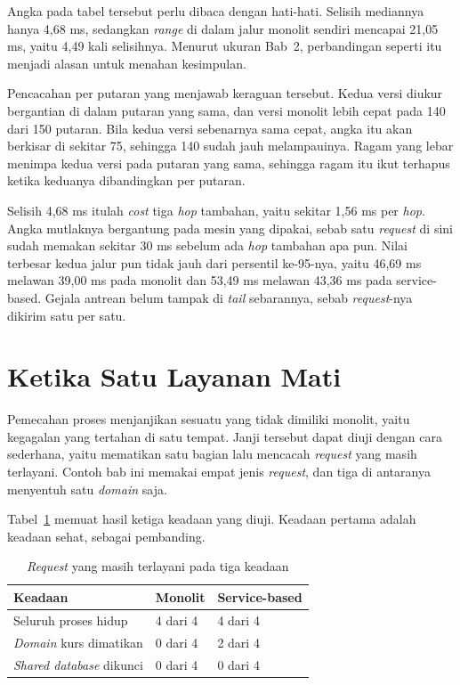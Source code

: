 Angka pada tabel tersebut perlu dibaca dengan hati-hati. Selisih mediannya
hanya 4,68 ms, sedangkan \textit{range} di dalam jalur
monolit sendiri mencapai
21,05 ms, yaitu 4,49 kali selisihnya. Menurut ukuran Bab~2, perbandingan seperti
itu menjadi alasan untuk menahan kesimpulan.

Pencacahan per putaran yang menjawab keraguan tersebut. Kedua versi diukur
bergantian di dalam putaran yang sama, dan versi monolit lebih cepat pada 140
dari 150 putaran. Bila kedua versi sebenarnya sama cepat, angka itu akan
berkisar di sekitar 75, sehingga 140 sudah jauh melampauinya. Ragam yang lebar
menimpa kedua versi pada putaran yang sama, sehingga ragam itu ikut terhapus
ketika keduanya dibandingkan per putaran.

Selisih 4,68 ms itulah \textit{cost} tiga \textit{hop} tambahan, yaitu sekitar 1,56 ms
per \textit{hop}. Angka mutlaknya bergantung pada mesin yang dipakai, sebab satu
\textit{request} di sini sudah memakan sekitar 30 ms sebelum ada \textit{hop}
tambahan apa pun. Nilai terbesar kedua jalur pun tidak jauh dari persentil
ke-95-nya, yaitu 46,69 ms melawan 39,00 ms pada monolit dan 53,49 ms melawan
43,36 ms pada service-based. Gejala antrean belum tampak di \textit{tail} sebarannya,
sebab \textit{request}-nya dikirim satu per satu.

\section{Ketika Satu Layanan Mati}

Pemecahan proses menjanjikan sesuatu yang tidak dimiliki monolit, yaitu
kegagalan yang tertahan di satu tempat. Janji tersebut dapat diuji dengan cara
sederhana, yaitu mematikan satu bagian lalu mencacah \textit{request} yang masih
terlayani. Contoh bab ini memakai empat jenis \textit{request}, dan tiga di antaranya
menyentuh satu \textit{domain} saja.

Tabel~\ref{tab:kegagalan-layanan} memuat hasil ketiga keadaan yang diuji. Keadaan
pertama adalah keadaan sehat, sebagai pembanding.

\begin{table}[htbp]
  \centering
  \caption{\textit{Request} yang masih terlayani pada tiga keadaan}
  \label{tab:kegagalan-layanan}
  \begin{tabularx}{\textwidth}{|X|l|l|}
    \hline
    \textbf{Keadaan} & \textbf{Monolit} & \textbf{Service-based} \\
    \hline
    Seluruh proses hidup & 4 dari 4 & 4 dari 4 \\
    \hline
    \textit{Domain} kurs dimatikan & 0 dari 4 & 2 dari 4 \\
    \hline
    \textit{Shared database} dikunci & 0 dari 4 & 0 dari 4 \\
    \hline
  \end{tabularx}
\end{table}

